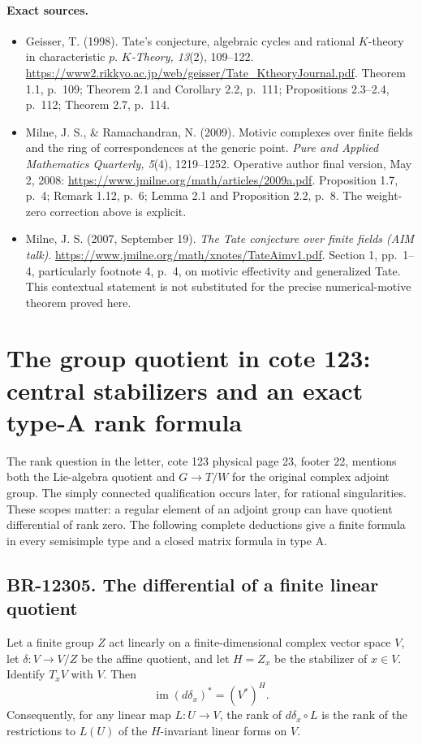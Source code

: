 \documentclass[11pt,a4paper]{article}
\theoremstyle{definition}\newtheorem{definition}[theorem]{Definition}
\theoremstyle{remark}\newtheorem{remark}[theorem]{Remark}
\begin{document}
\paragraph{Exact sources.}
\begin{itemize}
\item Geisser, T. (1998). Tate's conjecture, algebraic cycles and
rational $K$-theory in characteristic $p$. \emph{$K$-Theory,
13}(2), 109--122.
\url{https://www2.rikkyo.ac.jp/web/geisser/Tate_KtheoryJournal.pdf}.
Theorem 1.1, p.~109; Theorem 2.1 and Corollary 2.2, p.~111;
Propositions 2.3--2.4, p.~112; Theorem 2.7, p.~114.
\item Milne, J. S., \& Ramachandran, N. (2009). Motivic complexes
over finite fields and the ring of correspondences at the generic
point. \emph{Pure and Applied Mathematics Quarterly, 5}(4),
1219--1252. Operative author final version, May 2, 2008:
\url{https://www.jmilne.org/math/articles/2009a.pdf}.
Proposition 1.7, p.~4; Remark 1.12, p.~6; Lemma 2.1 and
Proposition 2.2, p.~8. The weight-zero correction above is explicit.
\item Milne, J. S. (2007, September 19). \emph{The Tate conjecture
over finite fields (AIM talk)}.
\url{https://www.jmilne.org/math/xnotes/TateAimv1.pdf}.
Section 1, pp.~1--4, particularly footnote 4, p.~4, on motivic
effectivity and generalized Tate. This contextual statement is
not substituted for the precise numerical-motive theorem proved here.
\end{itemize}


\section{The group quotient in cote 123: central stabilizers and an exact type-A rank formula}

The rank question in the letter, cote 123 physical page 23, footer 22,
mentions both the Lie-algebra quotient and $G\to T/W$ for the original
complex adjoint group.  The simply connected qualification occurs later,
for rational singularities.  These scopes matter: a regular element of
an adjoint group can have quotient differential of rank zero.  The
following complete deductions give a finite formula in every semisimple
type and a closed matrix formula in type A.

\subsection{BR-12305. The differential of a finite linear quotient}
Let a finite group $Z$ act linearly on a finite-dimensional complex
vector space $V$, let $\delta:V\to V/Z$ be the affine quotient, and
let $H=Z_x$ be the stabilizer of $x\in V$.  Identify $T_xV$ with $V$.
Then
\[
 \operatorname{im}(d\delta_x)^*=(V^*)^H.
 \tag{GR.1}
\]
Consequently, for any linear map $L:U\to V$, the rank of
$d\delta_x\circ L$ is the rank of the restrictions to $L(U)$ of
the $H$-invariant linear forms on $V$.
\end{document}
